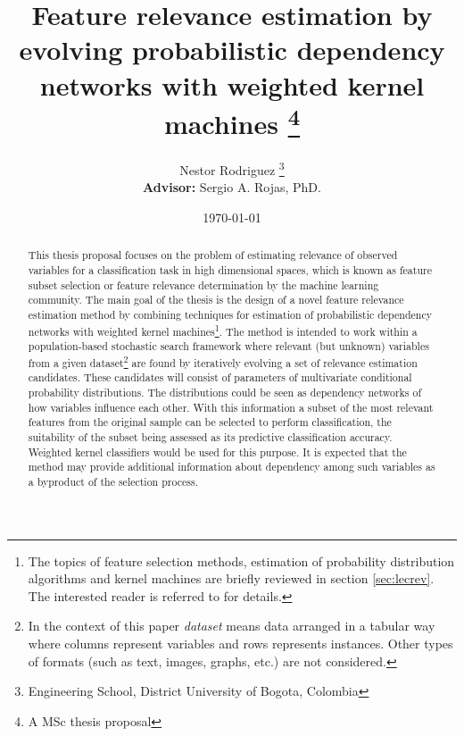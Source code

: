 
\singlespacing
\title{Feature relevance estimation by evolving probabilistic dependency networks with weighted kernel machines
\footnote{\tiny A MSc thesis proposal}}
\date{\today}
\author{Nestor Rodriguez  \footnote{\tiny Engineering School, District University of Bogota, Colombia}  \\ \small{\textbf{Advisor:} Sergio A. Rojas, PhD.}}

\maketitle

\begin{abstract}
\addtocounter{footnote}{2}
This thesis proposal focuses on the problem of estimating relevance of observed variables for a classification task in high dimensional spaces, which is known as feature subset selection or feature relevance determination by the machine learning community. The main goal of the thesis is the design of a novel feature relevance estimation method by combining techniques for estimation of probabilistic dependency networks with weighted kernel machines\footnote{\tiny The topics of feature selection methods, estimation of probability distribution algorithms and kernel machines are briefly reviewed in section \ref{sec:lecrev}. The interested reader is referred to \cite{guyon03,heckerman99, cristianini04} for details.}. The method is intended to work within a population-based stochastic search framework where relevant (but unknown) variables from a given dataset\footnote{\tiny In the context of this paper \emph{dataset} means data arranged in a tabular way where columns represent variables and rows represents instances.  Other types of formats (such as text, images, graphs, etc.) are not considered.} are found by iteratively evolving a set of relevance estimation candidates. These candidates will consist of parameters of multivariate conditional probability distributions. The distributions could be seen as dependency networks of how variables influence each other.  With this information a subset of the most relevant features from the original sample can be selected to perform classification, the suitability of the subset being assessed as its predictive classification accuracy. Weighted kernel classifiers would be used for this purpose. It is expected that the method may provide additional information about dependency among such variables as a byproduct of the selection process.
\end{abstract}


